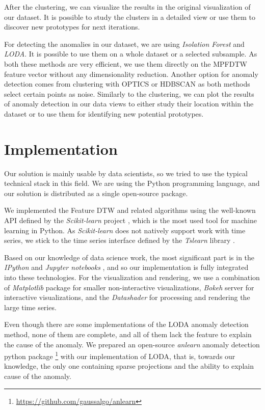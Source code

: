 After the clustering, we can visualize the results in the original visualization of our dataset. It is possible to study the clusters in a detailed view or use them to discover new prototypes for next iterations.

For detecting the anomalies in our dataset, we are using \textit{Isolation Forest} and \textit{LODA}. It is possible to use them on a whole dataset or a selected subsample. As both these methods are very efficient, we use them directly on the MPFDTW feature vector without any dimensionality reduction. Another option for anomaly detection comes from clustering with OPTICS or HDBSCAN as both methods select certain points as noise. Similarly to the clustering, we can plot the results of anomaly detection in our data views to either study their location within the dataset or to use them for identifying new potential prototypes.


\section{Implementation}
Our solution is mainly usable by data scientists, so we tried to use the typical technical stack in this field. We are using the Python programming language, and our solution is distributed as a single open-source package.

We implemented the Feature DTW and related algorithms using the well-known API defined by the \textit{Scikit-learn} project \cite{exp:sklearn_api,exp:scikit-learn}, which is the most used tool for machine learning in Python. As \textit{Scikit-learn} does not natively support work with time series, we stick to the time series interface defined by the \textit{Tslearn} library \cite{exp:tslearn}.

Based on our knowledge of data science work, the most significant part is in the \textit{IPython} \cite{exp:ipython} and \textit{Jupyter notebooks} \cite{exp:jupyter}, and so our implementation is fully integrated into these technologies. For the visualization and rendering, we use a combination of \textit{Matplotlib} package \cite{exp:matplotlib} for smaller non-interactive visualizations, \textit{Bokeh} server \cite{exp:bokeh} for interactive visualizations, and the \textit{Datashader} \cite{vis:datashader} for processing and rendering the large time series.

Even though there are some implementations of the LODA anomaly detection method, none of them are complete, and all of them lack the feature to explain the cause of the anomaly. We prepared an open-source \textit{anlearn} anomaly detection python package \footnote{\url{https://github.com/gaussalgo/anlearn}} with our implementation of LODA, that is, towards our knowledge, the only one containing sparse projections and the ability to explain cause of the anomaly.

